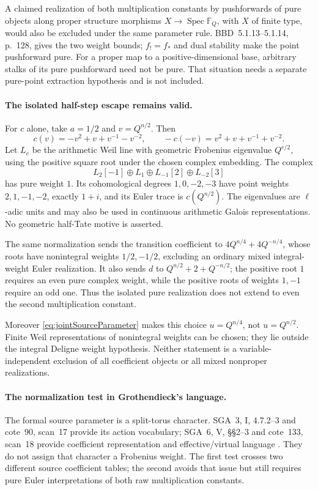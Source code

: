 A claimed realization of both multiplication constants
by pushforwards of pure objects along proper structure
morphisms \(X\to\operatorname{Spec}\mathbb F_Q\),
with \(X\) of finite type, would also be excluded under
the same parameter rule. BBD~5.1.13--5.1.14, p.~128,
gives the two weight bounds; \(f_!=f_*\) and dual
stability make the point pushforward pure.
For a proper map to a positive-dimensional base,
arbitrary stalks of its pure pushforward need not be
pure. That situation needs a separate pure-point
extraction hypothesis and is not included.

\paragraph{The isolated half-step escape remains valid.}
For \(c\) alone, take \(a=1/2\) and \(v=Q^{n/2}\).
Then
\[
 c(v)=-v^2+v+v^{-1}-v^{-2},\qquad
 -c(-v)=v^2+v+v^{-1}+v^{-2}.
\]
Let \(L_e\) be the arithmetic Weil line with geometric
Frobenius eigenvalue \(Q^{e/2}\), using the positive
square root under the chosen complex embedding.
The complex
\begin{equation}\label{eq:jointIsolatedPureEscape}
 L_2[-1]\oplus L_1\oplus L_{-1}[2]\oplus L_{-2}[3]
\end{equation}
has pure weight \(1\).
Its cohomological degrees \(1,0,-2,-3\) have point
weights \(2,1,-1,-2\), exactly \(1+i\), and its
Euler trace is \(c(Q^{n/2})\).
The eigenvalues are \(\ell\)-adic units and may also
be used in continuous arithmetic Galois representations.
No geometric half-Tate motive is asserted.

The same normalization sends the transition coefficient
to \(4Q^{n/4}+4Q^{-n/4}\), whose roots have nonintegral
weights \(1/2,-1/2\), excluding an ordinary mixed
integral-weight Euler realization.
It also sends \(d\) to \(Q^{n/2}+2+Q^{-n/2}\);
the positive root \(1\) requires an even pure complex
weight, while the positive roots of weights \(1,-1\)
require an odd one. Thus the isolated pure realization
does not extend to even the second multiplication constant.

Moreover \eqref{eq:jointSourceParameter} makes this choice
\(u=Q^{n/4}\), not \(u=Q^{n/2}\).
Finite Weil representations of nonintegral weights can
be chosen; they lie outside the integral Deligne weight
hypothesis. Neither statement is a variable-independent
exclusion of all coefficient objects or all mixed
nonproper realizations.

\paragraph{The normalization test in Grothendieck's language.}
The formal source parameter is a split-torus character.
SGA~3, I, 4.7.2--3 and cote~90, scan~17 provide its
action vocabulary; SGA~6, V, \S\S2--3 and cote~133,
scan~18 provide coefficient representation and
effective/virtual language \cite{SGA3,SGA6,Archive}.
They do not assign that character a Frobenius weight.
The first test crosses two different source coefficient
tables; the second avoids that issue but still requires
pure Euler interpretations of both raw multiplication constants.

